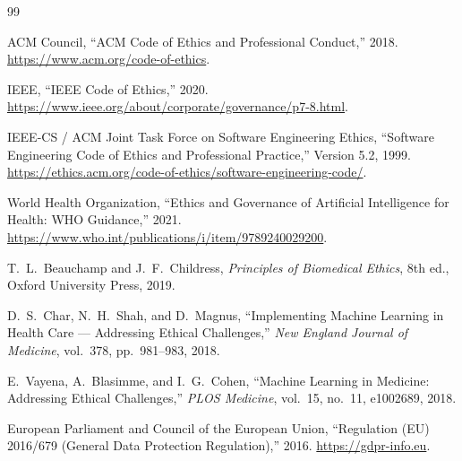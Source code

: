 \documentclass[12pt,a4paper]{article}
\begin{document}
\begin{thebibliography}{99}

ACM Council,
``ACM Code of Ethics and Professional Conduct,'' 2018.
\url{https://www.acm.org/code-of-ethics}.

IEEE,
``IEEE Code of Ethics,'' 2020.
\url{https://www.ieee.org/about/corporate/governance/p7-8.html}.

IEEE-CS / ACM Joint Task Force on Software Engineering Ethics,
``Software Engineering Code of Ethics and Professional Practice,''
Version 5.2, 1999.
\url{https://ethics.acm.org/code-of-ethics/software-engineering-code/}.

World Health Organization,
``Ethics and Governance of Artificial Intelligence for Health:
WHO Guidance,'' 2021.
\url{https://www.who.int/publications/i/item/9789240029200}.

T.~L.~Beauchamp and J.~F.~Childress,
\emph{Principles of Biomedical Ethics}, 8th ed.,
Oxford University Press, 2019.

D.~S.~Char, N.~H.~Shah, and D.~Magnus,
``Implementing Machine Learning in Health Care --- Addressing
Ethical Challenges,''
\emph{New England Journal of Medicine}, vol.~378, pp.~981--983,
2018.

E.~Vayena, A.~Blasimme, and I.~G.~Cohen,
``Machine Learning in Medicine: Addressing Ethical Challenges,''
\emph{PLOS Medicine}, vol.~15, no.~11, e1002689, 2018.

European Parliament and Council of the European Union,
``Regulation (EU) 2016/679 (General Data Protection Regulation),''
2016.
\url{https://gdpr-info.eu}.

\end{thebibliography}
\end{document}
